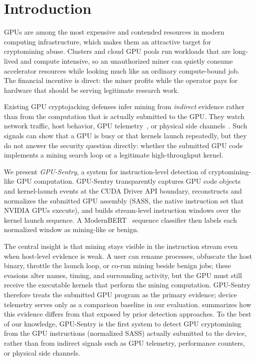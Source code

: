 \section{Introduction}
\label{sec:introduction}

GPUs are among the most expensive and contended resources in modern computing infrastructure, which makes them an attractive target for cryptomining abuse. Clusters and cloud GPU pools run workloads that are long-lived and compute intensive, so an unauthorized miner can quietly consume accelerator resources while looking much like an ordinary compute-bound job. The financial incentive is direct: the miner profits while the operator pays for hardware that should be serving legitimate research work.

Existing GPU cryptojacking defenses infer mining from \emph{indirect} evidence rather than from the computation that is actually submitted to the GPU. They watch network traffic, host behavior, GPU telemetry~\cite{pott2023gpucryptojacking,tanana2024gpucryptojacking}, or physical side channels~\cite{xiao2023magtracer,cao2025maginspector}. Such signals can show that a GPU is busy or that kernels launch repeatedly, but they do not answer the security question directly: whether the submitted GPU code implements a mining search loop or a legitimate high-throughput kernel.

We present \emph{GPU-Sentry}, a system for instruction-level detection of cryptomining-like GPU computation. GPU-Sentry transparently captures GPU code objects and kernel-launch events at the CUDA Driver API boundary, reconstructs and normalizes the submitted GPU assembly (SASS, the native instruction set that NVIDIA GPUs execute), and builds stream-level instruction windows over the kernel launch sequence. A ModernBERT~\cite{warner2024modernbert} sequence classifier then labels each normalized window as mining-like or benign.

The central insight is that mining stays visible in the instruction stream even when host-level evidence is weak. A user can rename processes, obfuscate the host binary, throttle the launch loop, or co-run mining beside benign jobs; these evasions alter names, timing, and surrounding activity, but the GPU must still receive the executable kernels that perform the mining computation. GPU-Sentry therefore treats the submitted GPU program as the primary evidence; device telemetry serves only as a comparison baseline in our evaluation.  summarizes how this evidence differs from that exposed by prior detection approaches. To the best of our knowledge, GPU-Sentry is the first system to detect GPU cryptomining from the GPU instructions (normalized SASS) actually submitted to the device, rather than from indirect signals such as GPU telemetry, performance counters, or physical side channels.

